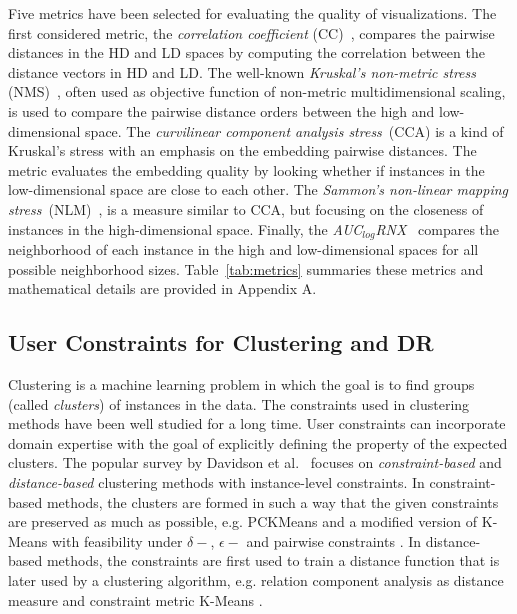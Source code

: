 Five metrics have been selected for evaluating the quality of visualizations. 
The first considered metric, the \emph{correlation coefficient} (CC)~\cite{geng2005}, compares the pairwise distances in the HD and LD spaces by computing the correlation between the distance vectors in HD and LD. The well-known \emph{Kruskal's non-metric stress} (NMS)~\cite{kruskal1964}, often used as objective function of non-metric multidimensional scaling, is used to compare the pairwise distance orders between the high and low-dimensional space. The \emph{curvilinear component analysis stress}~(CCA) \cite{demartines1997} is a kind of Kruskal's stress with an emphasis on the embedding pairwise distances. The metric evaluates the embedding quality by looking whether if instances in the low-dimensional space are close to each other. The \emph{Sammon's non-linear mapping stress}~(NLM)~\cite{sammon1969}, is a measure similar to CCA, but focusing on the closeness of instances in the high-dimensional space. Finally, the \emph{AUC$_{log}$RNX}~\cite{lee2015} compares the neighborhood of each instance in the high and low-dimensional spaces for all possible neighborhood sizes. Table~\ref{tab:metrics} summaries these metrics and mathematical details are provided in Appendix A. 

\subsection{User Constraints for Clustering and DR}\label{subsec:user_constraints_clustering_DR}

Clustering is a machine learning problem in which the goal is to find groups (called \emph{clusters}) of instances in the data. The constraints used in clustering methods have been well studied for a long time. User constraints can incorporate domain expertise with the goal of explicitly defining the property of the expected clusters.
The popular survey by Davidson et al.~\cite{Davidson2007surveyClt} focuses on \emph{constraint-based} and \emph{distance-based} clustering methods with instance-level constraints.
In constraint-based methods, the clusters are formed in such a way that the given constraints are preserved as much as possible, e.g. PCKMeans \cite{basu2004active} and a modified version of K-Means with feasibility under $\delta-$, $\epsilon-$ and pairwise constraints \cite{davidson2005clustering}.
In distance-based methods, the constraints are first used to train a distance function that is later used by a clustering algorithm, e.g. relation component analysis as distance measure \cite{bar2003learning} and constraint metric K-Means \cite{xing2003distance}.

